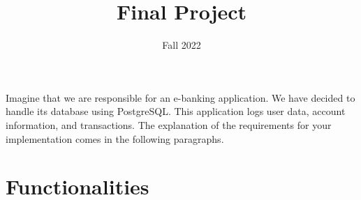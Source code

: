 \documentclass{homework}
\author{}
\date{Fall 2022}
\title{Final Project}
\begin{document}
 \maketitle

\section*{ }
Imagine that we are responsible for an e-banking application. We have decided to handle its database using PostgreSQL. This application logs user data, account information, and transactions. The explanation of the requirements for your implementation comes in the following paragraphs.

\section*{Functionalities}
\end{document}
